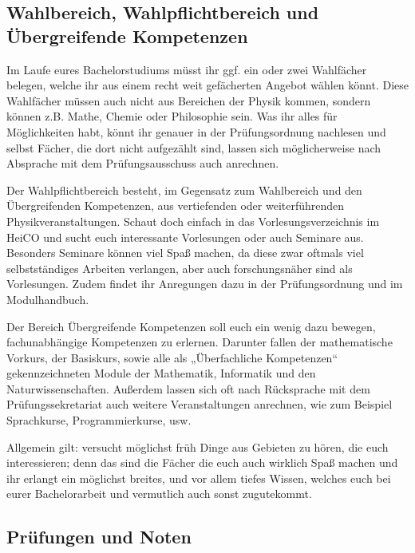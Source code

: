 \subsection{Wahlbereich, Wahlpflichtbereich und \\Übergreifende Kompetenzen}

Im Laufe eures Bachelorstudiums müsst ihr ggf. ein oder zwei Wahlfächer belegen, welche ihr aus einem recht weit gefächerten Angebot wählen könnt. Diese Wahlfächer müssen auch nicht aus Bereichen der Physik kommen, sondern können z.B. Mathe, Chemie oder Philosophie sein. Was ihr alles für Möglichkeiten habt, könnt ihr genauer in der Prüfungsordnung nachlesen und selbst Fächer, die dort nicht aufgezählt sind, lassen sich möglicherweise nach Absprache mit dem Prüfungsausschuss auch anrechnen.

Der Wahlpflichtbereich besteht, im Gegensatz zum Wahlbereich und den Übergreifenden Kompetenzen, aus vertiefenden oder weiterführenden Physikveranstaltungen. Schaut doch einfach in das Vorlesungsverzeichnis im HeiCO und sucht euch interessante Vorlesungen oder auch Seminare aus. Besonders Seminare können viel Spaß machen, da diese zwar oftmals viel selbstständiges Arbeiten verlangen, aber auch forschungsnäher sind als Vorlesungen. Zudem findet ihr Anregungen dazu in der Prüfungsordnung und im Modulhandbuch.

Der Bereich Übergreifende Kompetenzen soll euch ein wenig dazu bewegen, fachunabhängige Kompetenzen zu erlernen. Darunter fallen der mathematische Vorkurs, der Basiskurs, sowie alle als „Überfachliche Kompetenzen“ gekennzeichneten Module der Mathematik, Informatik und den Naturwissenschaften. Außerdem lassen sich oft nach Rücksprache mit dem Prüfungssekretariat auch weitere Veranstaltungen anrechnen, wie zum Beispiel Sprachkurse, Programmierkurse, usw.

Allgemein gilt: versucht möglichst früh Dinge aus Gebieten zu hören, die euch interessieren; denn das sind die Fächer die euch auch wirklich Spaß machen und ihr erlangt ein möglichst breites, und vor allem tiefes Wissen, welches euch bei eurer Bachelorarbeit und vermutlich auch sonst zugutekommt.

\subsection{Prüfungen und Noten}

